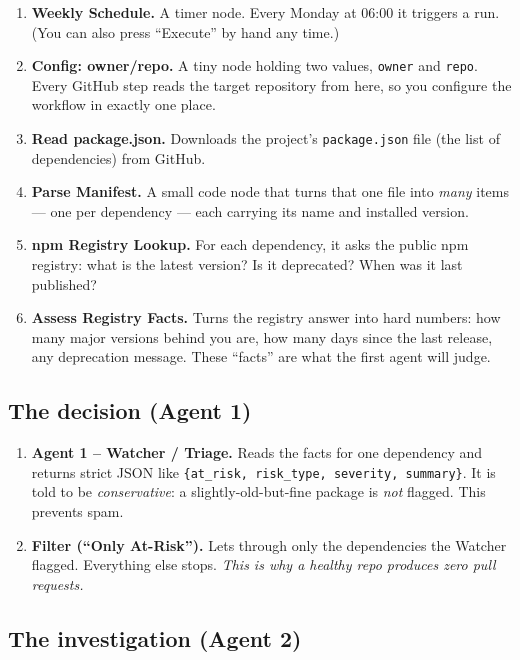 \documentclass[11pt,a4paper]{article}
\begin{document}
\begin{enumerate}[leftmargin=1.5em]
  \item \textbf{Weekly Schedule.} A timer node. Every Monday at 06:00 it triggers a run. (You can also
    press ``Execute'' by hand any time.)
  \item \textbf{Config: owner/repo.} A tiny node holding two values, \texttt{owner} and \texttt{repo}.
    Every GitHub step reads the target repository from here, so you configure the workflow in exactly
    one place.
  \item \textbf{Read package.json.} Downloads the project's \texttt{package.json} file (the list of
    dependencies) from GitHub.
  \item \textbf{Parse Manifest.} A small code node that turns that one file into \emph{many} items ---
    one per dependency --- each carrying its name and installed version.
  \item \textbf{npm Registry Lookup.} For each dependency, it asks the public npm registry: what is the
    latest version? Is it deprecated? When was it last published?
  \item \textbf{Assess Registry Facts.} Turns the registry answer into hard numbers: how many major
    versions behind you are, how many days since the last release, any deprecation message. These
    ``facts'' are what the first agent will judge.
\end{enumerate}

\subsection{The decision (Agent 1)}

\begin{enumerate}[leftmargin=1.5em, start=7]
  \item \textbf{Agent 1 -- Watcher / Triage.} Reads the facts for one dependency and returns strict JSON
    like \texttt{\{at\_risk, risk\_type, severity, summary\}}. It is told to be \emph{conservative}: a
    slightly-old-but-fine package is \emph{not} flagged. This prevents spam.
  \item \textbf{Filter (``Only At-Risk'').} Lets through only the dependencies the Watcher flagged.
    Everything else stops. \emph{This is why a healthy repo produces zero pull requests.}
\end{enumerate}

\subsection{The investigation (Agent 2)}
\end{document}
